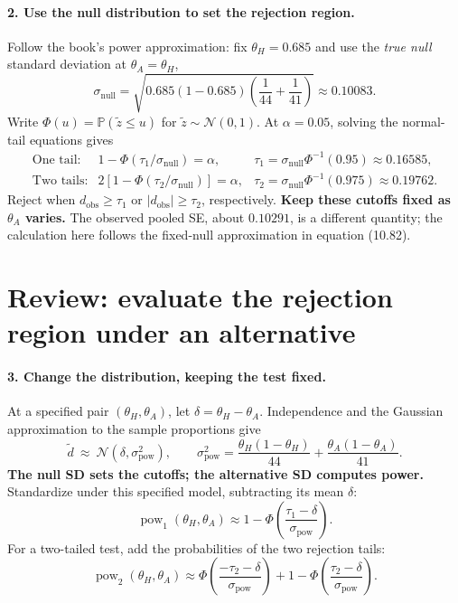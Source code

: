 \documentclass[11pt]{article}
\newcommand{\rv}[1]{\widetilde{#1}}
\newcommand{\Pbb}{\mathbb P}
\newcommand{\pow}{\operatorname{pow}}
\begin{document}
\paragraph{2. Use the null distribution to set the rejection region.}
Follow the book's power approximation: fix $\theta_H=0.685$ and use the
\emph{true null} standard deviation at $\theta_A=\theta_H$,
\[
 \sigma_{\mathrm{null}}=
 \sqrt{0.685(1-0.685)\left(\frac1{44}+\frac1{41}\right)}
 \approx0.10083.
\]
Write $\Phi(u)=\Pbb(\rv z\leq u)$ for $\rv z\sim\mathcal N(0,1)$.
At $\alpha=0.05$, solving the normal-tail equations gives
\[
 \begin{array}{lll}
 \text{One tail:}&1-\Phi(\tau_1/\sigma_{\mathrm{null}})=\alpha,
   &\tau_1=\sigma_{\mathrm{null}}\Phi^{-1}(0.95)\approx0.16585,\\[0.5em]
 \text{Two tails:}&2[1-\Phi(\tau_2/\sigma_{\mathrm{null}})]=\alpha,
   &\tau_2=\sigma_{\mathrm{null}}\Phi^{-1}(0.975)\approx0.19762.
 \end{array}
\]
Reject when $d_{\mathrm{obs}}\geq\tau_1$ or $|d_{\mathrm{obs}}|\geq\tau_2$,
respectively. \textbf{Keep these cutoffs fixed as $\theta_A$ varies.}
The observed pooled SE, about $0.10291$, is a different quantity; the
calculation here follows the fixed-null approximation in equation (10.82).

\newpage
\section*{Review: evaluate the rejection region under an alternative}
\paragraph{3. Change the distribution, keeping the test fixed.}
At a specified pair $(\theta_H,\theta_A)$, let $\delta=\theta_H-\theta_A$.
Independence and the Gaussian approximation to the sample proportions give
\[
 \rv d\ \approx\ \mathcal N(\delta,\sigma_{\mathrm{pow}}^2),\qquad
 \sigma_{\mathrm{pow}}^2=
 \frac{\theta_H(1-\theta_H)}{44}+\frac{\theta_A(1-\theta_A)}{41}.
\]
\textbf{The null SD sets the cutoffs; the alternative SD computes power.}
Standardize under this specified model, subtracting its mean $\delta$:
\[
 \boxed{\pow_1(\theta_H,\theta_A)
 \approx1-\Phi\!\left(\frac{\tau_1-\delta}{\sigma_{\mathrm{pow}}}\right).}
\]
For a two-tailed test, add the probabilities of the two rejection tails:
\[
 \boxed{\pow_2(\theta_H,\theta_A)\approx
 \Phi\!\left(\frac{-\tau_2-\delta}{\sigma_{\mathrm{pow}}}\right)
 +1-\Phi\!\left(\frac{\tau_2-\delta}{\sigma_{\mathrm{pow}}}\right).}
\]
\end{document}
